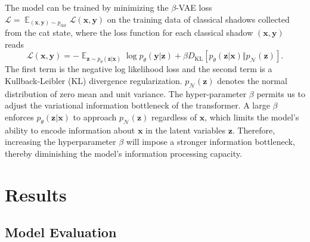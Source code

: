 \documentclass[fleqn,11pt]{wlscirep}
\newcommand{\E}{\mathop{\mathbb{E}}}
\newcommand{\dsE}{\mathbb{E}}
\newcommand{\scL}{\mathcal{L}}
\newcommand{\scN}{\mathcal{N}}
\newcommand{\vect}[1]{{\bm{#1}}}
\newcommand{\eq}[1]{\begin{equation}#1\end{equation}}
\begin{document}
The model can be trained by minimizing the $\beta$-VAE loss $\scL=\mathop{\dsE}_{(\vect{x},\vect{y})\sim p_\text{dat}}\scL(\vect{x},\vect{y})$ on the training data of classical shadows collected from the cat state, where the loss function for each classical shadow $(\vect{x},\vect{y})$ reads 
\eq{\scL(\vect{x},\vect{y})=-\E_{\vect{z}\sim p_\theta(\vect{z}|\vect{x})}\log p_\theta(\vect{y}|\vect{z})+\beta D_\text{KL}[p_\theta(\vect{z}|\vect{x})\Vert p_\scN(\vect{z})].}
The first term is the negative log likelihood loss and the second term is a Kullback-Leibler (KL) divergence regularization. $p_\scN(\vect{z})$ denotes the normal distribution of zero mean and unit variance. The hyper-parameter $\beta$ permits us to adjust the variational information bottleneck of the transformer. A large $\beta$ enforces $p_\theta(\vect{z}|\vect{x})$ to approach $p_\scN(\vect{z})$ regardless of $\vect{x}$, which limits the model's ability to encode information about $\vect{x}$  in the latent variables $\vect{z}$. Therefore, increasing the hyperparameter $\beta$ will impose a stronger information bottleneck, thereby diminishing the model’s information processing capacity.



\section*{Results}

\subsection*{Model Evaluation}
\end{document}
